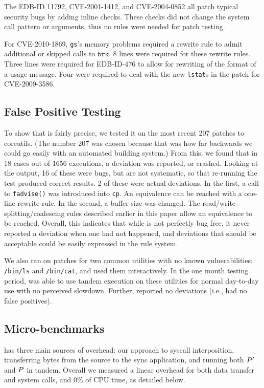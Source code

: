 The EDB-ID 11792, CVE-2001-1412, and CVE-2004-0852 all patch typical
security bugs by adding inline checks. These checks did not change the
system call pattern or arguments, thus no rules were needed for patch
testing.

For CVE-2010-1869, \texttt{gs}'s memory problems required a rewrite rule
to admit additional or skipped calls to $\texttt{brk}$.
8 lines were required for these rewrite rules. Three lines were required
for EDB-ID-476 to allow for rewriting of the format of a usage
message. Four were required to deal with the new \texttt{lstat}s in the patch for CVE-2009-3586.

\subsection{False Positive Testing}
To show that \tachyon is fairly precise, we tested it on the most recent 207 patches to coreutils. (The number 207 was chosen because that was how far backwards we could go easily with an automated building system.) From this, we found that in 18 cases out of 1656 executions, a deviation was reported, or \tachyon crashed. Looking at the output, 16 of these were \tachyon bugs, but are not systematic, so that re-running the test produced correct results. 2 of these were actual deviations. In the first, a call to \texttt{fadvise()} was introduced into \texttt{cp}. An equivalence can be reached with a one-line rewrite rule. In the second, a buffer size was changed. The read/write splitting/coalescing rules described earlier in this paper allow an equivalence to be reached. Overall, this indicates that while \tachyon is not perfectly bug free, it never reported a deviation when one had not happened, and deviations that should be acceptable could be easily expressed in the rule system.

We also ran \tachyon on patches for two common utilities with no known
vulnerabilities:
\texttt{/bin/ls} and \texttt{/bin/cat}, and used them interactively.
In the one month testing period, \tachyon was able to use tandem
execution on these utilities for normal day-to-day use with no
perceived slowdown. Further, \tachyon
reported no deviations (i.e., had no false positives).

\subsection{Micro-benchmarks}


\tachyon has three main sources of overhead: our approach to syscall
interposition, transferring bytes from the source to the sync
application, and running both $P'$ and $P$
in tandem. Overall we measured a linear overhead for both data transfer and
system calls, and 0\% of CPU time, as detailed below.


